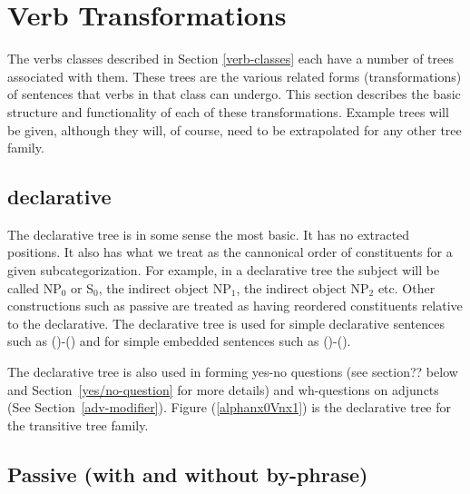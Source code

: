 \section{Verb Transformations}
\label{verb-transformations}

The verbs classes described in Section \ref{verb-classes} each have a number of
trees associated with them.  These trees are the various related forms
(transformations) of sentences that verbs in that class can undergo.  This
section describes the basic structure and functionality of each of these
transformations.  Example trees will be given, although they will, of course,
need to be extrapolated for any other tree family.

\subsection{declarative}
The declarative tree is in some sense the most basic. It has no
extracted positions. It also has what we treat as the cannonical order
of constituents for a given subcategorization. For example, in a
declarative tree the subject will be called NP$_{0}$ or S$_{0}$, the
indirect object NP$_{1}$, the indirect object NP$_{2}$ etc. Other
constructions such as passive are treated as having reordered
constituents relative to the declarative. The declarative tree is used for
simple declarative sentences such as ()-() and for simple embedded
sentences such as ()-(). 


The declarative tree is also used in forming yes-no questions (see
section?? below and Section~\ref{yes/no-question} for more details) and 
wh-questions on adjuncts (See Section~\ref{adv-modifier}). Figure (\ref{alphanx0Vnx1}) is the
declarative tree for the transitive tree family.

\begin{figure}[htbp]
\end{figure}



\subsection{Passive (with and without by-phrase)}

